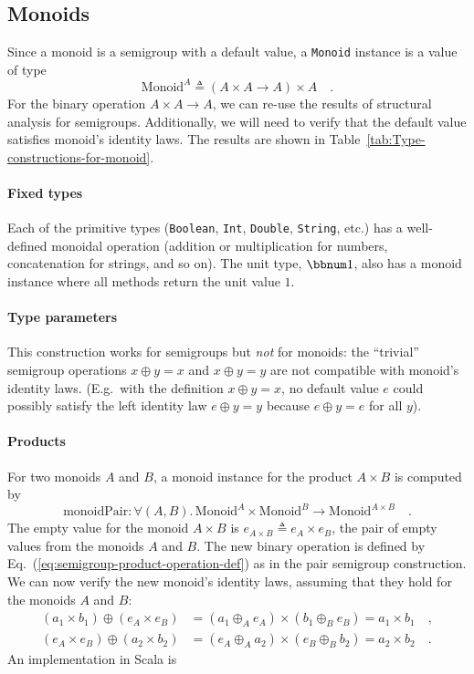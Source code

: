 \subsection{Monoids\label{subsec:Monoids-constructions}}

Since a monoid is a semigroup with a default value, a \lstinline!Monoid!
instance is a value of type
\[
\text{Monoid}^{A}\triangleq\left(A\times A\rightarrow A\right)\times A\quad.
\]
For the binary operation $A\times A\rightarrow A$, we can re-use
the results of structural analysis for semigroups. Additionally, we
will need to verify that the default value satisfies monoid's identity
laws. The results are shown in Table~\ref{tab:Type-constructions-for-monoid}.

\paragraph{Fixed types}

Each of the primitive types (\lstinline!Boolean!, \lstinline!Int!,
\lstinline!Double!, \lstinline!String!, etc.) has a well-defined
monoidal operation (addition or multiplication for numbers, concatenation
for strings, and so on). The unit type, $\bbnum 1$, also has a monoid
instance where all methods return the unit value $1$.

\paragraph{Type parameters}

This construction works for semigroups but \emph{not} for monoids:
the ``trivial'' semigroup operations $x\oplus y=x$ and $x\oplus y=y$
are not compatible with monoid's identity laws. (E.g.~with the definition
$x\oplus y=x$, no default value $e$ could possibly satisfy the left
identity law $e\oplus y=y$ because $e\oplus y=e$ for all $y$).

\paragraph{Products}

For two monoids $A$ and $B$, a monoid instance for the product $A\times B$
is computed by
\[
\text{monoidPair}:\forall(A,B).\,\text{Monoid}^{A}\times\text{Monoid}^{B}\rightarrow\text{Monoid}^{A\times B}\quad.
\]
The empty value for the monoid $A\times B$ is $e_{A\times B}\triangleq e_{A}\times e_{B}$,
the pair of empty values from the monoids $A$ and $B$. The new binary
operation is defined by Eq.~(\ref{eq:semigroup-product-operation-def})
as in the pair semigroup construction. We can now verify the new monoid's
identity laws, assuming that they hold for the monoids $A$ and $B$:
\begin{align*}
(a_{1}\times b_{1})\oplus(e_{A}\times e_{B}) & =(a_{1}\oplus_{A}e_{A})\times(b_{1}\oplus_{B}e_{B})=a_{1}\times b_{1}\quad,\\
(e_{A}\times e_{B})\oplus(a_{2}\times b_{2}) & =(e_{A}\oplus_{A}a_{2})\times(e_{B}\oplus_{B}b_{2})=a_{2}\times b_{2}\quad.
\end{align*}
An implementation in Scala is

